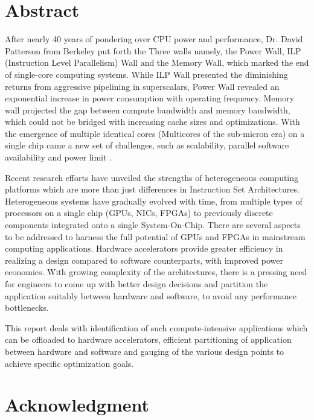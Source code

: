 \chapter*{Abstract} 
\label{ch0i_Abstract}

\quad After nearly 40 years of pondering over CPU power and performance, Dr. David Patterson from Berkeley put forth the Three walls namely, the Power Wall, ILP (Instruction Level Parallelism) Wall and the Memory Wall, which marked the end of single-core computing systems\cite{mem_wall}. While ILP Wall presented the diminishing returns from aggressive pipelining in superscalars, Power Wall revealed an exponential increase in power consumption with operating frequency. Memory wall projected the gap between compute bandwidth and memory bandwidth, which could not be bridged with increasing cache sizes and optimizations. With the emergence of multiple identical cores (Multicores of the sub-micron era) on a single chip came a new set of challenges, such as scalability, parallel software availability and power limit \cite{moore2011data}.\newline

Recent research efforts have unveiled the strengths of heterogeneous computing platforms which are more than just differences in Instruction Set Architectures. Heterogeneous systems have gradually evolved with time, from multiple types of processors on a single chip (GPUs, NICs, FPGAs) to previously discrete components integrated onto a single System-On-Chip. There are several aspects to be addressed to harness the full potential of GPUs and FPGAs in mainstream computing applications. Hardware accelerators provide greater efficiency in realizing a design compared to software counterparts, with improved power economics. With growing complexity of the architectures, there is a pressing need for engineers to come up with better design decisions and partition the application suitably between hardware and software, to avoid any performance bottlenecks. \newline

This report deals with identification of such compute-intensive applications which can be offloaded to hardware accelerators, efficient partitioning of application between hardware and software and gauging of the various design points to achieve specific optimization goals.


\chapter*{Acknowledgment} 
\label{ch0ii_Acknowledgement}

